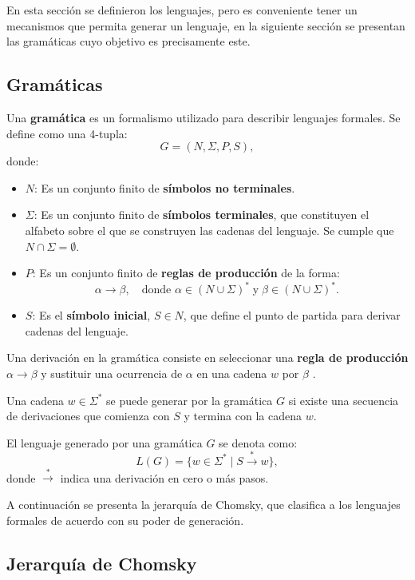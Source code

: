 \documentclass[12pt]{article}
\begin{document}
En esta sección se definieron los lenguajes, pero es conveniente tener un mecanismos que permita generar un lenguaje,
en la siguiente sección se presentan las gramáticas cuyo objetivo es precisamente este.

\subsection{Gramáticas}
\label{sec:grammars}

Una \textbf{gramática} es un formalismo utilizado para describir lenguajes formales. Se define como una 4-tupla:
\[
  G = (N, \Sigma, P, S),
\]
donde:
\begin{itemize}
  \item \(N\): Es un conjunto finito de \textbf{símbolos no terminales}.
  \item \(\Sigma\): Es un conjunto finito de \textbf{símbolos terminales}, que constituyen el alfabeto sobre el que se construyen las cadenas del lenguaje. Se cumple que \(N \cap \Sigma = \emptyset\).
  \item \(P\): Es un conjunto finito de \textbf{reglas de producción} de la forma:
        \[
          \alpha \to \beta, \quad \text{donde } \alpha \in (N \cup \Sigma)^* \;\text{y}\; \beta \in (N \cup \Sigma)^*.
        \]
        
  \item \(S\): Es el \textbf{símbolo inicial}, \(S \in N\), que define el punto de partida para derivar cadenas del lenguaje.
\end{itemize}

Una derivación en la gramática consiste en seleccionar una \textbf{regla de producción} $\alpha \to \beta$ y sustituir una ocurrencia de 
$\alpha$ en una cadena $w$ por $\beta$ \cite{authomataTheory}.

Una cadena $w\in\Sigma^*$  se puede generar por la gramática $G$ si existe una secuencia de derivaciones que comienza con $S$
y termina con la cadena $w$.

El lenguaje generado por una gramática \(G\) se denota como:
\[
  L(G) = \{ w \in \Sigma^* \mid S \overset{*}{\to} w \},
\]
donde \(\overset{*}{\to}\) indica una derivación en cero o más pasos.

A continuación se presenta la jerarquía de Chomsky, que clasifica a los lenguajes formales de acuerdo con su poder de generación.

\subsection{Jerarquía de Chomsky}
\end{document}
